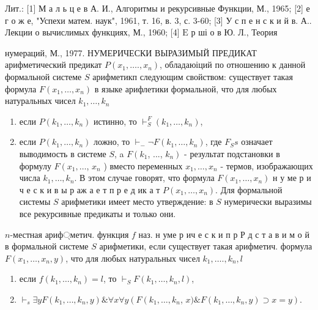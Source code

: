 \documentclass[10pt]{article}
\begin{document}
Лит.: [1] М а л ь ц е в А. И., Алгоритмы и рекурсивные Функции, М., 1965; [2] е г о ж е, "Успехи матем. наук", 1961, т. 16, в. 3, с. 3-60; [3] У с п е н с к и й в. А.. Лекции о вычислимых функциях, М., 1960; [4] $\mathrm{E}$ р ші о в Ю. Л., Теория

нумераций, М., 1977. НУМЕРИЧЕСКИ ВЫРАЗИМЫЙ ПРЕДИКАТ арифметический предикат $P\left(x_{1}, \ldots ., x_{n}\right)$, обладаюіций по отношению к данной формальной системе $S$ арифметикп следующим свойством: существует такая формула $F\left(x_{1}, \ldots, x_{n}\right)$ в языке арифлетики формальной, что для любых натуральных чисел $k_{1}, \ldots, k_{n}$



\begin{enumerate}

  \item если $P\left(k_{1}, \ldots, k_{n}\right)$ истинно, то $\vdash_{S}^{F}\left(k_{1}, \ldots, k_{n}\right)$,



  \item если $P\left(k_{1}, \ldots, k_{n}\right)$ ложно, то $\vdash_{-} \neg F\left(k_{1}, \ldots, k_{n}\right)$, где $F_{S} s$ означает выводимость в системе $S$, a $F\left(k_{1}\right.$, ..., $\left.k_{n}\right)$ - результат подстановки в формулу $F\left(x_{1}, \ldots\right.$, $x_{n}$ ) вместо переменных $x_{1}, \ldots, x_{n}$ - термов, изображающих числа $k_{1}, \ldots, k_{n}$. В этом случае говорят, что формула $F\left(x_{1}, \ldots, x_{n}\right)$ н у ме р и ч е с к и в ы р аж а е т п р е д ик а т $P\left(x_{1}, \ldots, x_{n}\right)$. Для формальной системы $S$ арифметики имеет место утверждение: в $S$ нумерически выразимы все рекурсивные предикаты и только они.



\end{enumerate}



$n$-местная ариф্метич. функция $f$ наз. н уме р ич е с к и п р Р д с т а в и м о й в формальной системе $S$ арифметики, если существует такая арифметич. формула $F\left(x_{1}, \ldots, x_{n}, y\right)$, что для любых натуральных чисел $k_{1}, \ldots ., k_{n}, l$



\begin{enumerate}

  \item если $f\left(k_{1}, \ldots, k_{n}\right)=l$, то $\vdash_{S} F\left(k_{1}, \ldots, k_{n}, l\right)$,



  \item $\vdash_{s} \exists y F\left(k_{1}, \ldots, k_{n}, y\right) \& \forall x \forall y\left(F\left(k_{1}, \ldots, k_{n}\right.\right.$, $\left.x) \& F\left(k_{1}, \ldots, k_{n}, y\right) \supset x=y\right)$.



\end{enumerate}
\end{document}
